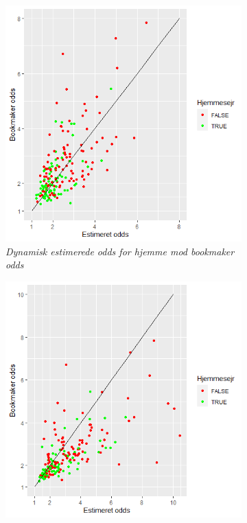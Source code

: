 \documentclass[11pt,a4paper]{article}
\begin{document}
\begin{figure}[ht!]
  \centering
  \begin{subfigure}[b]{0.4\textwidth}
    \includegraphics[width=\textwidth]{DynHjemmeOdds.png}
    \caption{\textit{Dynamisk estimerede odds for hjemme mod bookmaker odds}}
    \label{fig:DynHjemmeOdds}
  \end{subfigure}
    \hspace{0.2cm}
    \begin{subfigure}[b]{0.4\linewidth}
\includegraphics[width=\textwidth]{StatiskHjemmeOdds.png}

\end{subfigure}
\end{figure}
\end{document}
